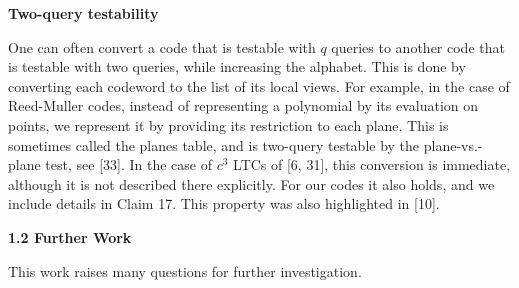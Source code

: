 \par\medskip\noindent\textbf{Two-query testability}\par




One can often convert a code that is testable with $q$ queries to another code that is testable with two queries, while increasing the alphabet. This is done by converting each codeword to the list of its local views. For example, in the case of Reed-Muller codes, instead of representing a polynomial by its evaluation on points, we represent it by providing its restriction to each plane. This is sometimes called the planes table, and is two-query testable by the plane-vs.-plane test, see [33]. In the case of $c^{3}$ LTCs of [6, 31], this conversion is immediate, although it is not described there explicitly. For our codes it also holds, and we include details in Claim 17. This property was also highlighted in [10].\par






\par\medskip\noindent\textbf{
1.2 Further Work}\par




This work raises many questions for further investigation.\par


